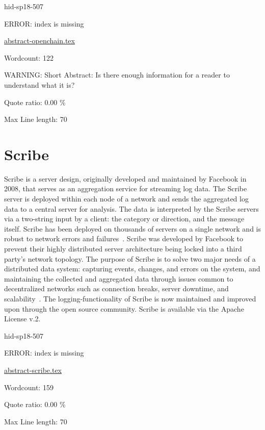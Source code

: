 \begin{IU}

hid-sp18-507

ERROR: index is missing

\href{https://github.com/cloudmesh-community/hid-sp18-507/blob/master//technology/abstract-openchain.tex}{abstract-openchain.tex}

 

Wordcount: 122

WARNING: Short Abstract: Is there enough information for a reader to understand what it is?


Quote ratio: 0.00 \%
 
Max Line length: 70
\end{IU}

\section{Scribe}

Scribe is a server design, originally developed and maintained by
Facebook in 2008, that serves as an aggregation service for streaming
log data. The Scribe server is deployed within each node of a network
and sends the aggregated log data to a central server for
analysis. The data is interpreted by the Scribe servers via a
two-string input by a client: the category or direction, and the
message itself. Scribe has been deployed on thousands of servers on a
single network and is robust to network errors and
failures~\cite{hid-sp18-507-FBScribe}. Scribe was developed by
Facebook to prevent their highly distributed server architecture being
locked into a third party's network topology. The purpose of Scribe is
to solve two major needs of a distributed data system: capturing
events, changes, and errors on the system, and maintaining the
collected and aggregated data through issues common to decentralized
networks such as connection breaks, server downtime, and
scalability~\cite{hid-sp18-507-ScribeNote}. The logging-functionality
of Scribe is now maintained and improved upon through the open source
community. Scribe is available via the Apache License v.2.


\begin{IU}

hid-sp18-507

ERROR: index is missing

\href{https://github.com/cloudmesh-community/hid-sp18-507/blob/master//technology/abstract-scribe.tex}{abstract-scribe.tex}

 

Wordcount: 159


Quote ratio: 0.00 \%
 
Max Line length: 70
\end{IU}


